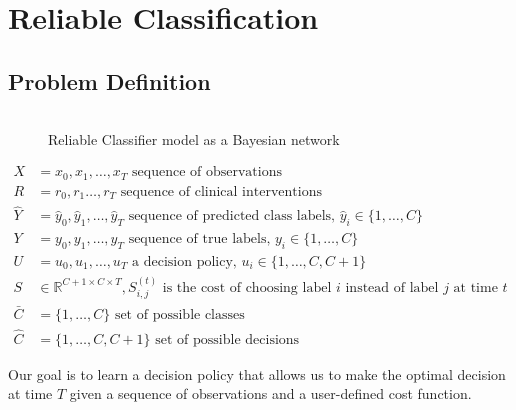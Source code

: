 \documentclass[12pt,solutions]{article}
\newcommand{\yh}{\hat{y}}
\newcommand{\R}{\mathbb{R}}
\begin{document}
\section{Reliable Classification}

\subsection{Problem Definition}
\begin{figure}[ht]
  \begin{center}
    \begin{tabular}{cc}
      
    \end{tabular}
  \end{center}
  \caption{Reliable Classifier model as a Bayesian network}
\label{fig:reclas_bnet}
\end{figure}


\begin{align*}
X &= x_0, x_1, \ldots, x_T \text{ sequence of observations}\\
R &= r_0, r_1 \ldots, r_T \text{ sequence of clinical interventions}\\
\hat{Y} &= \yh_0, \yh_1, \ldots, \yh_T \text{ sequence of predicted class labels, $\yh_i \in \{1,\ldots, C\}$}\\
Y&=y_0,y_1,\ldots,y_T \text{ sequence of true labels, $y_i \in \{1,\ldots, C\}$}\\
U&=u_0,u_1,\ldots,u_T \text{ a decision policy, $u_i \in \{1,\ldots, C, C+1\}$}\\
S &\in \R^{C+1 \times C \times T}, S_{i,j}^{(t)} \text{ is the cost of choosing label $i$ instead of label $j$ at time $t$}\\
\bar{C} &= \{1,\ldots, C\} \text{ set of possible classes}\\
\hat{C} &= \{1,\ldots, C,C+1\} \text{ set of possible decisions}
\end{align*}

Our goal is to learn a decision policy that allows us to make the optimal decision at time $T$ given a sequence of observations and a user-defined cost function.
\end{document}
